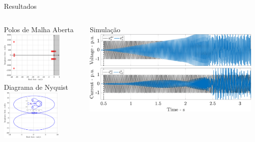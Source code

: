 \begin{frame}{Resultados}
\begin{columns}
\begin{columns}
\centering
\small
Polos de Malha Aberta
\includegraphics[width=0.80\linewidth, height=2.5cm]{./figuras/aplicacao/poles_ca_instavel}
\centering
\small
Diagrama de Nyquist
\includegraphics[width=0.75\linewidth, height=2.5cm]{./figuras/aplicacao/nyquist_ca_instavel}
\end{columns}
\small 
Simulação
\includegraphics[width=0.96\linewidth]{./figuras/aplicacao/time_resp_ca_instavel}


\end{columns}

\end{frame}



